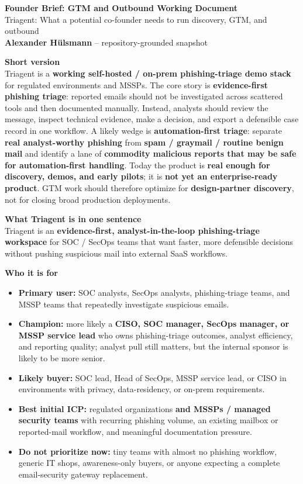 \documentclass[10pt,a4paper]{article}
\begin{document}
\begin{center}
{\Large \textbf{Founder Brief: GTM and Outbound Working Document}}\\[0.15em]
{\large Triagent: What a potential co-founder needs to run discovery, GTM, and outbound}\\[0.35em]
\textbf{Alexander H\"ulsmann} -- repository-grounded snapshot
\end{center}
\small

\vspace{0.25em}
\noindent\textbf{Short version}\\
Triagent is a \textbf{working self-hosted / on-prem phishing-triage demo stack} for regulated environments and MSSPs. The core story is \textbf{evidence-first phishing triage}: reported emails should not be investigated across scattered tools and then documented manually. Instead, analysts should review the message, inspect technical evidence, make a decision, and export a defensible case record in one workflow. A likely wedge is \textbf{automation-first triage}: separate \textbf{real analyst-worthy phishing} from \textbf{spam / graymail / routine benign mail} and identify a lane of \textbf{commodity malicious reports that may be safe for automation-first handling}. Today the product is \textbf{real enough for discovery, demos, and early pilots}; it is \textbf{not yet an enterprise-ready product}. GTM work should therefore optimize for \textbf{design-partner discovery}, not for closing broad production deployments.

\vspace{0.3em}
\noindent\textbf{What Triagent is in one sentence}\\
Triagent is an \textbf{evidence-first, analyst-in-the-loop phishing-triage workspace} for SOC / SecOps teams that want faster, more defensible decisions without pushing suspicious mail into external SaaS workflows.

\noindent\textbf{Who it is for}
\begin{itemize}
  \item \textbf{Primary user:} SOC analysts, SecOps analysts, phishing-triage teams, and MSSP teams that repeatedly investigate suspicious emails.
  \item \textbf{Champion:} more likely a \textbf{CISO, SOC manager, SecOps manager, or MSSP service lead} who owns phishing-triage outcomes, analyst efficiency, and reporting quality; analyst pull still matters, but the internal sponsor is likely to be more senior.
  \item \textbf{Likely buyer:} SOC lead, Head of SecOps, MSSP service lead, or CISO in environments with privacy, data-residency, or on-prem requirements.
  \item \textbf{Best initial ICP:} regulated organizations \textbf{and MSSPs / managed security teams} with recurring phishing volume, an existing mailbox or reported-mail workflow, and meaningful documentation pressure.
  \item \textbf{Do not prioritize now:} tiny teams with almost no phishing workflow, generic IT shops, awareness-only buyers, or anyone expecting a complete email-security gateway replacement.
\end{itemize}
\end{document}

